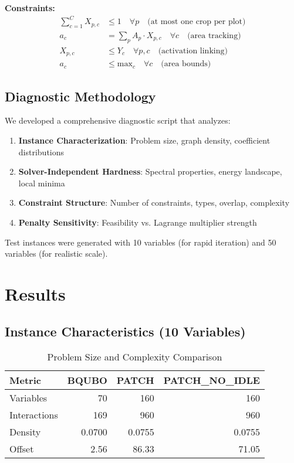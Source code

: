 \documentclass[11pt,a4paper]{article}
\begin{document}
\textbf{Constraints:}
\begin{align}
\sum_{c=1}^{C} X_{p,c} &\leq 1 \quad \forall p \quad \text{(at most one crop per plot)} \\
a_c &= \sum_p A_p \cdot X_{p,c} \quad \forall c \quad \text{(area tracking)} \\
X_{p,c} &\leq Y_c \quad \forall p, c \quad \text{(activation linking)} \\
a_c &\leq \text{max}_c \quad \forall c \quad \text{(area bounds)}
\end{align}

\subsection{Diagnostic Methodology}

We developed a comprehensive diagnostic script that analyzes:

\begin{enumerate}
    \item \textbf{Instance Characterization}: Problem size, graph density, coefficient distributions
    \item \textbf{Solver-Independent Hardness}: Spectral properties, energy landscape, local minima
    \item \textbf{Constraint Structure}: Number of constraints, types, overlap, complexity
    \item \textbf{Penalty Sensitivity}: Feasibility vs. Lagrange multiplier strength
\end{enumerate}

Test instances were generated with 10 variables (for rapid iteration) and 50 variables (for realistic scale).

\section{Results}

\subsection{Instance Characteristics (10 Variables)}

\begin{table}[H]
\centering
\caption{Problem Size and Complexity Comparison}
\begin{tabular}{lrrr}
\toprule
\textbf{Metric} & \textbf{BQUBO} & \textbf{PATCH} & \textbf{PATCH\_NO\_IDLE} \\
\midrule
Variables & 70 & 160 & 160 \\
Interactions & 169 & 960 & 960 \\
Density & 0.0700 & 0.0755 & 0.0755 \\
Offset & 2.56 & 86.33 & 71.05 \\
\bottomrule
\end{tabular}
\end{table}
\end{document}

